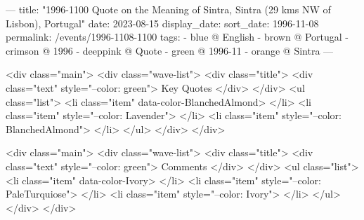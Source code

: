 ---
title: "1996-1100 Quote on the Meaning of Sintra, Sintra (29 kms NW of Lisbon), Portugal"
date: 2023-08-15
display_date: 
sort_date: 1996-11-08
permalink: /events/1996-1108-1100
tags:
  - blue @ English
  - brown @ Portugal
  - crimson @ 1996
  - deeppink @ Quote
  - green @ 1996-11
  - orange @ Sintra
---

<div class="main">
  <div class="wave-list">
    <div class="title">
      <div class="text" style="--color: green">
        Key Quotes
      </div>
    </div>
    <ul class="list">
        <li class="item" data-color-BlanchedAlmond>
        </li>
        <li class="item" style="--color: Lavender">
        </li>
        <li class="item" style="--color: BlanchedAlmond">
        </li>
      </ul>
  </div>
</div>

<div class="main">
  <div class="wave-list">
    <div class="title">
      <div class="text" style="--color: green">
        Comments
      </div>
    </div>
    <ul class="list">
        <li class="item" data-color-Ivory>
        </li>
        <li class="item" style="--color: PaleTurquiose">
        </li>
        <li class="item" style="--color: Ivory">
        </li>
      </ul>
  </div>
</div>